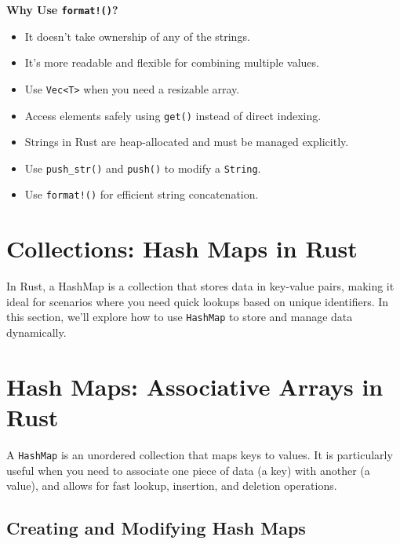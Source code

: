 \documentclass[a4paper,12pt]{report}
\begin{document}
	\noindent\textbf{Why Use \texttt{format!()}?}
	\begin{itemize}
		\item It doesn’t take ownership of any of the strings.
		\item It’s more readable and flexible for combining multiple values.
	\end{itemize}
	
	\begin{takeawaybox}
	
		\begin{itemize}
			\item Use \texttt{Vec<T>} when you need a resizable array.
			\item Access elements safely using \texttt{get()} instead of direct indexing.
			\item Strings in Rust are heap-allocated and must be managed explicitly.
			\item Use \texttt{push\_str()} and \texttt{push()} to modify a \texttt{String}.
			\item Use \texttt{format!()} for efficient string concatenation.
		\end{itemize}
	\end{takeawaybox}
	
	
	
	\section{Collections: Hash Maps in Rust}
	
	In Rust, a HashMap is a collection that stores data in key-value pairs, making it ideal for scenarios where you need quick lookups based on unique identifiers. In this section, we’ll explore how to use \texttt{HashMap} to store and manage data dynamically.
	
	\section*{Hash Maps: Associative Arrays in Rust}
	
	A \texttt{HashMap} is an unordered collection that maps keys to values. It is particularly useful when you need to associate one piece of data (a key) with another (a value), and allows for fast lookup, insertion, and deletion operations.
	
	\subsection*{Creating and Modifying Hash Maps}
	
\end{document}
